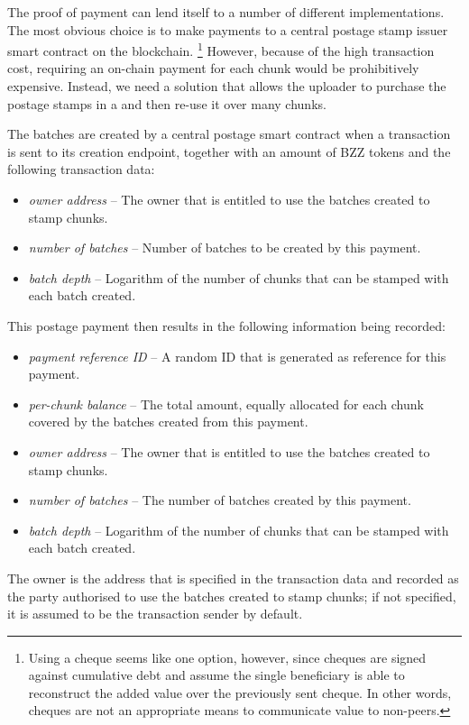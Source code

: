 The proof of payment can lend itself to a number of different implementations. The most obvious choice is to make payments to a central postage stamp issuer smart contract on the blockchain.%
%
\footnote{Using a cheque seems like one option, however, since cheques are signed against cumulative debt and assume the single beneficiary is able to reconstruct the added value over the previously sent cheque. In other words, cheques are not an appropriate means to communicate value to non-peers.}
%
However, because of the high transaction cost, requiring an on-chain payment for each chunk would be prohibitively expensive. Instead, we need a solution that allows the uploader to purchase the postage stamps in a  and then re-use it over many chunks. 


The batches are created by a central postage smart contract when a transaction is sent to its creation endpoint, together with an amount of BZZ tokens and the following transaction data:

\begin{itemize}
\item \emph{owner address} -- The owner that is entitled to use the batches created to stamp chunks.
\item \emph{number of batches} -- Number of batches to be created by this payment.
\item \emph{batch depth} -- Logarithm of the number of chunks that can be stamped with each batch created.
\end{itemize}

This postage payment then results in the following information being recorded:

\begin{itemize}
\item \emph{payment reference ID} -- A random ID that is generated as reference for this payment.
\item \emph{per-chunk balance} -- The total amount, equally allocated for each chunk covered by the batches created from this payment.
\item \emph{owner address} -- The owner that is entitled to use the batches created to stamp chunks.
\item \emph{number of batches} -- The number of batches created by this payment.
\item \emph{batch depth} -- Logarithm of the number of chunks that can be stamped with each batch created.
\end{itemize}


The owner is the address that is specified in the transaction data and recorded as the party authorised to use the batches created to stamp chunks; if not specified, it is assumed to be the transaction sender by default. 

